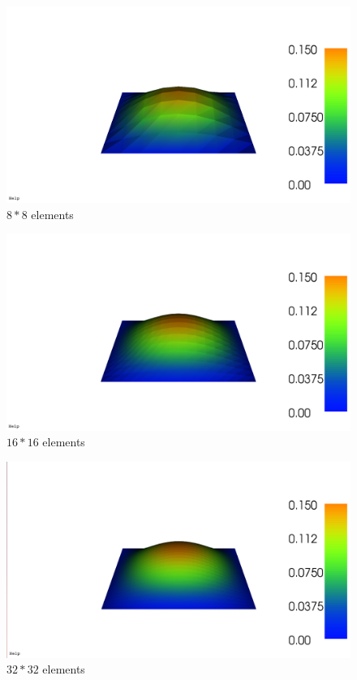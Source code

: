 \begin{figure}[h]
	\center
	\includegraphics[scale = 0.25]{images/64.png}
	\caption{$8 * 8$ elements}
\end{figure}
\begin{figure}[h]
	\center
	\includegraphics[scale = 0.25]{images/256.png}
	\caption{$16 * 16$ elements}
\end{figure}
\begin{figure}[h]
	\center
	\includegraphics[scale = 0.25]{images/1024.png}
	\caption{$32 * 32$ elements}
\end{figure}